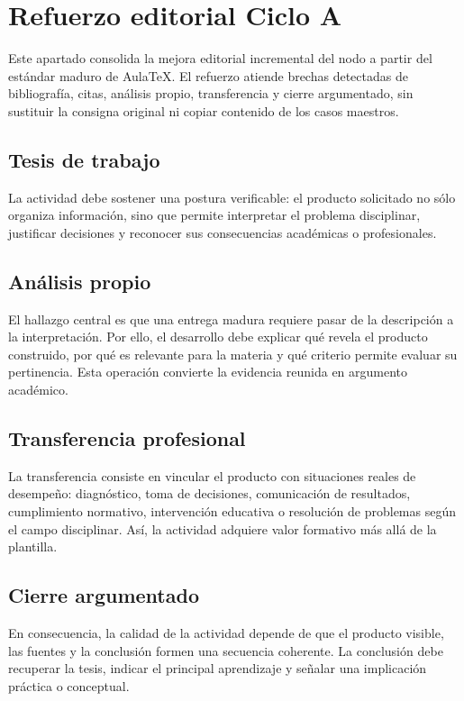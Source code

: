 \documentclass[
	spanish,
	letterpaper, oneside
]{article}
\begin{document}
\section*{Refuerzo editorial Ciclo A}
Este apartado consolida la mejora editorial incremental del nodo a partir del estándar maduro de AulaTeX. El refuerzo atiende brechas detectadas de bibliografía, citas, análisis propio, transferencia y cierre argumentado, sin sustituir la consigna original ni copiar contenido de los casos maestros.

\subsection*{Tesis de trabajo}
La actividad debe sostener una postura verificable: el producto solicitado no sólo organiza información, sino que permite interpretar el problema disciplinar, justificar decisiones y reconocer sus consecuencias académicas o profesionales.

\subsection*{Análisis propio}
El hallazgo central es que una entrega madura requiere pasar de la descripción a la interpretación. Por ello, el desarrollo debe explicar qué revela el producto construido, por qué es relevante para la materia y qué criterio permite evaluar su pertinencia. Esta operación convierte la evidencia reunida en argumento académico.

\subsection*{Transferencia profesional}
La transferencia consiste en vincular el producto con situaciones reales de desempeño: diagnóstico, toma de decisiones, comunicación de resultados, cumplimiento normativo, intervención educativa o resolución de problemas según el campo disciplinar. Así, la actividad adquiere valor formativo más allá de la plantilla.

\subsection*{Cierre argumentado}
En consecuencia, la calidad de la actividad depende de que el producto visible, las fuentes y la conclusión formen una secuencia coherente. La conclusión debe recuperar la tesis, indicar el principal aprendizaje y señalar una implicación práctica o conceptual.
\end{document}
